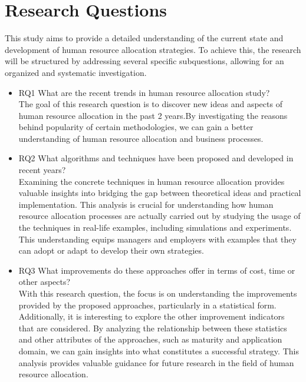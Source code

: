 \documentclass[runningheads]{llncs}
\begin{document}
\section{Research Questions}
This study aims to provide a detailed understanding of the current state and development of human resource allocation strategies. To achieve this, the research will be structured by addressing several specific subquestions, allowing for an organized and systematic investigation.\\
\begin{itemize}
    \item RQ1 What are the recent trends in human resource allocation study?\\
    The goal of this research question is to discover new ideas and aspects of human resource allocation in the past 2 years.By investigating the reasons behind popularity of certain methodologies, we can gain a better understanding of human resource allocation and business processes.\\
    \item RQ2 What algorithms and techniques have been proposed and developed in recent years?\\
    Examining the concrete techniques in human resource allocation provides valuable insights into bridging the gap between theoretical ideas and practical implementation. This analysis is crucial for understanding how human resource allocation processes are actually carried out by studying the usage of the techniques in real-life examples, including simulations and experiments. This understanding equips managers and employers with examples that they can adopt or adapt to develop their own strategies.\\
    \item RQ3 What improvements do these approaches offer in terms of cost, time or other aspects?\\
    With this research question, the focus is on understanding the improvements provided by the proposed approaches, particularly in a statistical form. Additionally, it is interesting to explore the other improvement indicators that are considered. By analyzing the relationship between these statistics and other attributes of the approaches, such as maturity and application domain, we can gain insights into what constitutes a successful strategy. This analysis provides valuable guidance for future research in the field of human resource allocation.
\end{itemize} 
\end{document}
